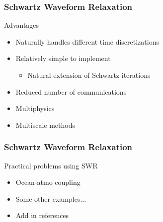 \documentclass{beamer}
\begin{document}
\begin{frame}
{\begin{figure}
       
    \end{figure}
  }
\end{frame}

\begin{frame}
  \frametitle{Schwartz Waveform Relaxation}
  \vspace*{-0.25in}

  Advantages
  \begin{itemize}
  \item Naturally handles different time discretizations
  \item Relatively simple to implement
    \begin{itemize}
    \item Natural extension of Schwartz iterations
    \end{itemize}
  \item Reduced number of communications
  \item Multiphysics
  \item Multiscale methods
  \end{itemize}

\end{frame}

\begin{frame}
  \frametitle{Schwartz Waveform Relaxation}
  \vspace*{-0.25in}

  Practical problems using SWR
  \begin{itemize}
  \item Ocean-atmo coupling
  \item Some other examples...
  \item Add in references    
  \end{itemize}

\end{frame}
\end{document}
